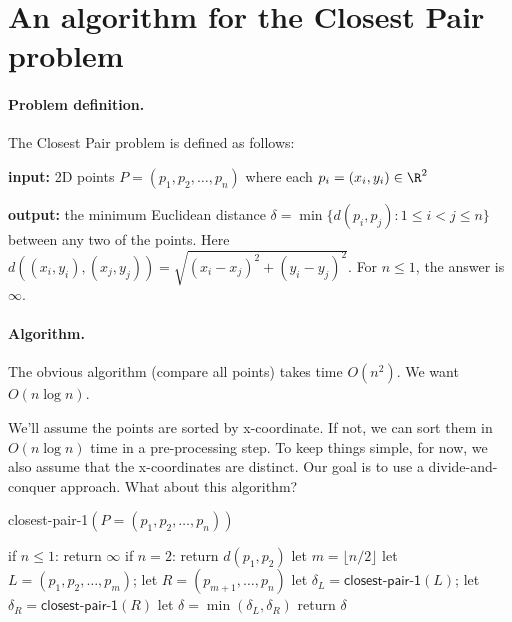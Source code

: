 

\section{An algorithm for the Closest Pair problem}\label{dc: sec: closest pair}

\paragraph{Problem definition.}

The Closest Pair problem is defined as follows:
\begin{mylist}
\item \textbf{input:}
   2D points $P=(p_1, p_2, \ldots, p_n)$ where each $p_i=(x_i, y_i)\in \R^2$
\item \textbf{output:} the minimum Euclidean distance
  $\delta=\min\{ d(p_i, p_j) : 1\le i < j \le n\}$
  between any two of the points.
  Here $d((x_i, y_i), (x_j, y_j)) = \sqrt{(x_i-x_j)^2 + (y_i-y_j)^2}$.
  For $n\le 1$, the answer is $\infty$.
\end{mylist}

\paragraph{Algorithm.}
The obvious algorithm (compare all points) takes time $O(n^2)$.
We want $O(n\log n)$.

We'll assume the points are sorted by x-coordinate.
If not, we can sort them in $O(n\log n)$ time in a pre-processing step.
To keep things simple, for now, we also assume that the x-coordinates are distinct.
Our goal is to use a divide-and-conquer approach.
What about this algorithm?

\begin{myframed}
\begin{steps}
  \item[] {\sf closest-pair-1}$(P=(p_1, p_2, \ldots, p_n))$

    \step if $n \le 1$: return $\infty$
    \step if $n = 2$: return $d(p_1, p_2)$
    \step let $m=\lfloor n/2\rfloor$
    \step let $L=(p_1, p_2, \ldots, p_m)$;
    let $R=(p_{m+1}, \ldots, p_n)$
    \step let $\delta_L = \textsf{closest-pair-1}(L)$; let $\delta_R = \textsf{closest-pair-1}(R)$
    \step let $\delta = \min(\delta_L, \delta_R)$
    \step return $\delta$ 
  \end{steps}
\end{myframed}

